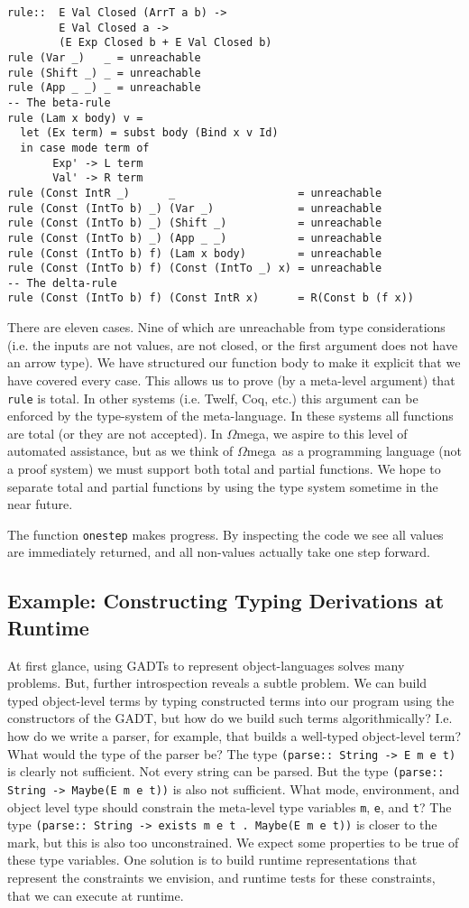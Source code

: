 \documentclass[11pt,twoside,A4]{llncs}
\newcommand{\om}{\emph{$\Omega$}mega}
\begin{document}
{\small
\begin{verbatim}
rule::  E Val Closed (ArrT a b) ->
        E Val Closed a ->
        (E Exp Closed b + E Val Closed b)
rule (Var _)   _ = unreachable
rule (Shift _) _ = unreachable
rule (App _ _) _ = unreachable
-- The beta-rule
rule (Lam x body) v =
  let (Ex term) = subst body (Bind x v Id)
  in case mode term of
       Exp' -> L term
       Val' -> R term
rule (Const IntR _)      _                   = unreachable
rule (Const (IntTo b) _) (Var _)             = unreachable
rule (Const (IntTo b) _) (Shift _)           = unreachable
rule (Const (IntTo b) _) (App _ _)           = unreachable
rule (Const (IntTo b) f) (Lam x body)        = unreachable
rule (Const (IntTo b) f) (Const (IntTo _) x) = unreachable
-- The delta-rule
rule (Const (IntTo b) f) (Const IntR x)      = R(Const b (f x))
\end{verbatim}}
There are eleven cases. Nine of which are unreachable from type
considerations (i.e. the inputs are not values, are not closed, or the
first argument does not have an arrow type). We have structured our
function body to make it explicit that we have covered every case. This
allows us to prove (by a meta-level argument) that {\tt rule} is total. In
other systems (i.e. Twelf, Coq, etc.) this argument can be enforced by the
type-system of the meta-language. In these systems all functions are total
(or they are not accepted). In \om, we aspire to this level of automated
assistance, but as we think of \om\ as a programming language (not a proof
system) we must support both total and partial functions. We hope to
separate total and partial functions by using the type system sometime in
the near future. 

The function {\tt onestep} makes progress. By inspecting the code we see
all values are immediately returned, and all non-values actually take one
step forward.
 
 
 \subsection{Example: Constructing Typing Derivations at Runtime}
 
 At first glance, using GADTs to represent object-languages
 solves many problems. But, further introspection reveals a subtle
 problem. We can build typed object-level terms by typing
 constructed terms into our program using the constructors of the GADT, but how do we build
 such terms algorithmically? I.e. how do we write a parser,
 for example, that builds a well-typed object-level term? What
 would the type of the parser be?
 The type {\tt (parse:: String -> E m e t)} is clearly not
 sufficient. Not every string can be parsed.
 But the type  {\tt (parse:: String -> Maybe(E m e t))} is also
 not sufficient. What mode, environment, and object level type
 should constrain the meta-level type variables {\tt m}, {\tt e}, and
 {\tt t}? The type
 {\tt (parse:: String -> exists m e t . Maybe(E m e t))} is closer
 to the mark, but this is also too unconstrained.  We expect
 some properties to be true of these type variables. One solution
 is to build runtime representations that represent the constraints
 we envision, and runtime tests for these constraints, that we can execute at runtime.
 
\end{document}
